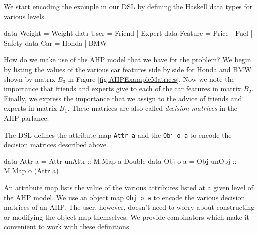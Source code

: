 \documentclass{jfp}
\newcommand{\prog}[1]{\texttt{#1}}
\begin{document}
We start encoding the example in our DSL by defining the Haskell data types for various levels. 
\begin{haskellcode}
data Weight  = Weight
data User    = Friend | Expert 
data Feature = Price | Fuel | Safety 
data Car     = Honda | BMW  
\end{haskellcode}

How do we make use of the AHP model that we have for the problem? We begin by listing the values of the various car features side by side for Honda and BMW shown by matrix $B_3$ in Figure \ref{fig:AHPExampleMatrices}. Now we note the importance that friends and experts give to each of the car features in matrix $B_2$. Finally, we express the importance that we assign to the advice of friends and experts in matrix $B_1$. These matrices are also called \emph{decision matrices} in the AHP parlance. 

The DSL defines the attribute map \prog{Attr a} and the \prog{Obj o a} to encode the decision matrices described above. 
\begin{haskellcode}
data Attr a = Attr {unAttr :: M.Map a Double}
data Obj o a = Obj {unObj :: M.Map o (Attr a)}
\end{haskellcode}
An attribute map lists the value of the various attributes listed at a given level of the AHP model. We use an object map \prog{Obj o a} to encode the various decision matrices of an AHP. The user, however, doesn't need to worry about constructing or modifying the object map themselves. We provide combinators which make it convenient to work with these definitions. 
\end{document}
